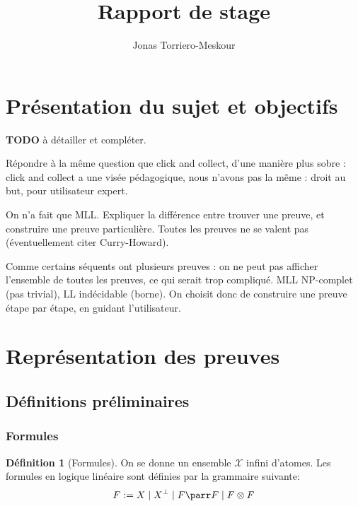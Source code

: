 \documentclass[11pt,a4paper]{article}
\title{Rapport de stage}
\author{Jonas Torriero-Meskour}
\theoremstyle{plain}
\theoremstyle{definition}
\newtheorem{definition}{Définition}
\theoremstyle{remark}
\newcommand*{\orth}{^\perp}
\newcommand*{\tensor}{\otimes}
\newcommand*{\todo}{{\normalfont \textbf{TODO}} }
\begin{document}
\maketitle

\section{Présentation du sujet et objectifs}
\todo{à détailler et compléter.}

Répondre à la même question que click and collect, d'une manière plus sobre : click and collect a une visée pédagogique, nous n'avons pas la même : droit au but, pour utilisateur expert.

On n'a fait que MLL. Expliquer la différence entre trouver une preuve, et construire une preuve particulière. Toutes les preuves ne se valent pas (éventuellement citer Curry-Howard).

Comme certains séquents ont plusieurs preuves : on ne peut pas afficher l'ensemble de toutes les preuves, ce qui serait trop compliqué. MLL NP-complet (pas trivial), LL indécidable (borne). On choisit donc de construire une preuve étape par étape, en guidant l'utilisateur.

\section{Représentation des preuves}
\subsection{Définitions préliminaires}
\subsubsection{Formules}
\begin{definition}[Formules]
On se donne un ensemble $\mathcal{X}$ infini d'atomes. Les formules en logique linéaire sont définies par la grammaire suivante:
\begin{equation*}
F := X \mid X\orth \mid F \parr F \mid F \tensor F
\end{equation*}
\end{definition}
\end{document}
